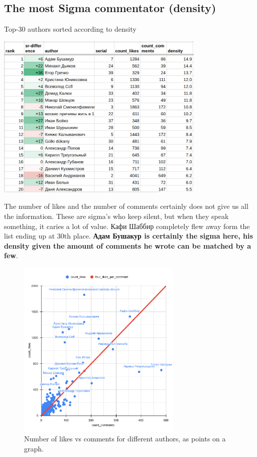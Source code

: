 \documentclass[
	12pt
] {article}
\begin{document}
\subsection{The most Sigma commentator (density)}
	\begin{table}[H]
		\centering
		\caption{Top-30 authors sorted according to density \cite{sheet-density}}
		\label{table-density}
		\includegraphics[width=0.75\textwidth]{table-density}
	\end{table}

	The number of likes and the number of comments certainly does not give us all the information. These are sigma's who keep silent, but when they speak something, it caries a lot of value. Кафи Шаббир completely flew away form the list ending up at 30th place. \textbf{Адам Бушакур is certainly the sigma here, his density given the amount of comments he wrote can be matched by a few}.

	\begin{figure}[H]
		\centering
		\includegraphics[width=0.7\textwidth]{fig-count-likes-comments-author-points}
		\caption{Number of likes vs comments for different authors, as points on a graph.}
		\label{fig-count-likes-comments-author-points}
	\end{figure}
\end{document}
